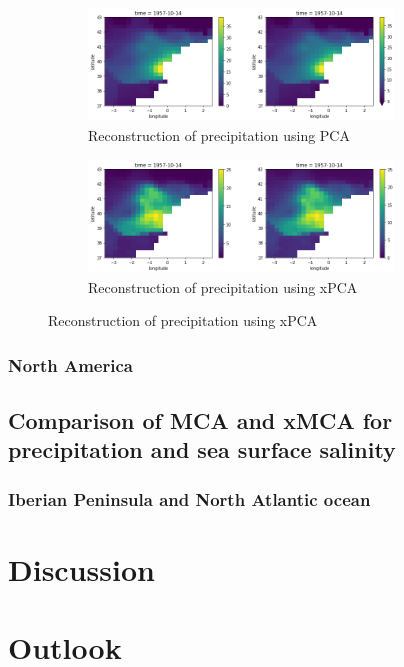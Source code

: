 \documentclass[11pt, oneside]{book}
\theoremstyle{plain}
\theoremstyle{remark}
\begin{document}
\begin{figure}[h!]
\centering
\begin{subfigure}{.5\textwidth}
    \centering
    \includegraphics[width=.95\linewidth, height=3cm]{vlc-rec}
    \caption{Reconstruction of precipitation using PCA}
\end{subfigure}%
\begin{subfigure}{.5\textwidth}
    \centering
    \includegraphics[width=.95\linewidth, height=3cm]{vlc-tran-rec}
    \caption{Reconstruction of precipitation using xPCA}
\end{subfigure}
\end{figure}

\subsection{North America}

\section{Comparison of MCA and xMCA for precipitation and sea surface salinity}
\subsection{Iberian Peninsula and North Atlantic ocean}


\chapter{Discussion}
\chapter{Outlook}


\appendix

\end{document}
